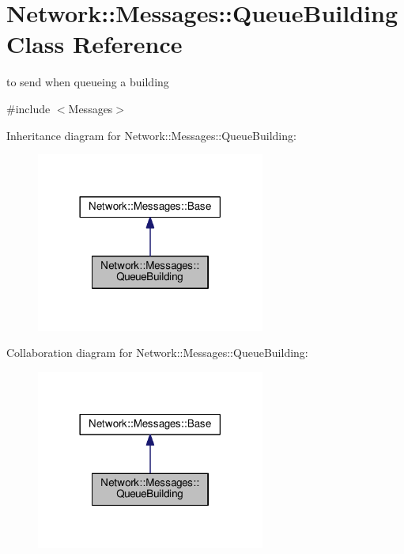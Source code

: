 \hypertarget{class_network_1_1_messages_1_1_queue_building}{}\section{Network\+:\+:Messages\+:\+:Queue\+Building Class Reference}
\label{class_network_1_1_messages_1_1_queue_building}


to send when queueing a building  




{\ttfamily \#include $<$Messages$>$}



Inheritance diagram for Network\+:\+:Messages\+:\+:Queue\+Building\+:
\nopagebreak
\begin{figure}[H]
\begin{center}
\leavevmode
\includegraphics[width=213pt]{class_network_1_1_messages_1_1_queue_building__inherit__graph}
\end{center}
\end{figure}


Collaboration diagram for Network\+:\+:Messages\+:\+:Queue\+Building\+:
\nopagebreak
\begin{figure}[H]
\begin{center}
\leavevmode
\includegraphics[width=213pt]{class_network_1_1_messages_1_1_queue_building__coll__graph}
\end{center}
\end{figure}
